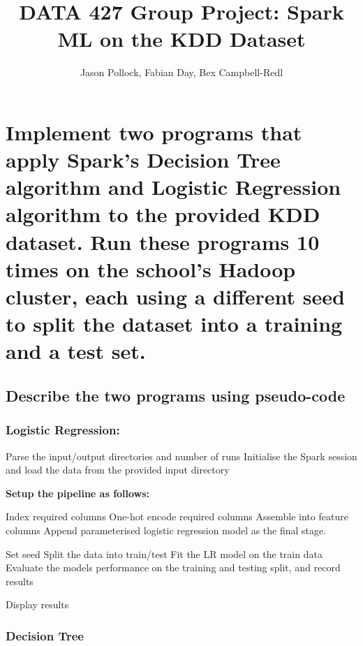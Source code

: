 \documentclass[12pt]{article}
\title{DATA 427 Group Project: Spark ML on the KDD Dataset}
\author{Jason Pollock, Fabian Day, Bex Campbell-Redl}
\date{}
\begin{document}
\maketitle

\section{Implement two programs that apply Spark’s Decision Tree algorithm and Logistic Regression algorithm to the provided KDD
dataset. Run these programs 10 times on the school’s Hadoop cluster, each
using a different seed to split the dataset into a training and a test set.}

\subsection{Describe the two programs using pseudo-code}

\subsubsection{Logistic Regression:}

\begin{algorithm}
\caption{Spark Logistic Regression}
\begin{algorithmic}[1]

\State Parse the input/output directories and number of runs
\State Initialise the Spark session and load the data from the provided input directory

\Statex
\Statex \textbf{Setup the pipeline as follows:}

\State Index required columns
\State One-hot encode required columns
\State Assemble into feature columns
\State Append parameterised logistic regression model as the final stage.

      \State Set seed
      \State Split the data into train/test
      \State Fit the LR model on the train data
      \State Evaluate the models performance on the training and testing split, and record results
   \EndFor

\State Display results

\end{algorithmic}
\end{algorithm}

\subsubsection{Decision Tree}
\end{document}
